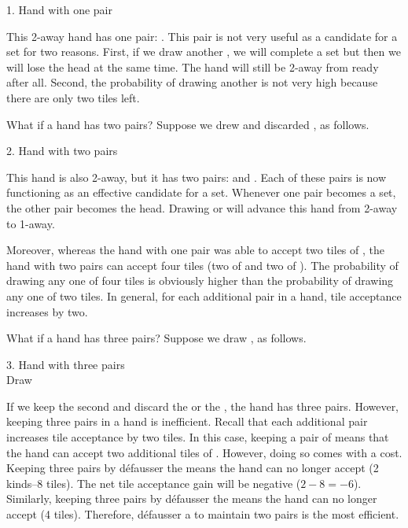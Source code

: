 {%
\begin{itembox}[r]{1. Hand with one pair}
\bp
{}\bei
\ep
\end{itembox}
\noindent
This 2-away hand has one pair: {\LARGE{}}. This pair is not very useful as a candidate for a set for two reasons. First, if we draw another {\LARGE{}}, we will complete a set but then we will lose the head at the same time. The hand will still be 2-away from ready after all. Second, the probability of drawing another {\LARGE{}} is not very high because there are only two tiles left. 

\bigskip
What if a hand has two pairs? Suppose we drew {\LARGE{}} and discarded {\LARGE\bei}, as follows.

\bigskip
\begin{itembox}[r]{2. Hand with two pairs}
\bp
{}
\ep
\end{itembox}
\noindent This hand is also 2-away, but it has two pairs: {\LARGE{}} and {\LARGE{}}. 
Each of these pairs is now functioning as an effective candidate for a set. Whenever one pair becomes a set, the other pair becomes the head. Drawing {\LARGE{}} or {\LARGE{}} will advance this hand from 2-away to 1-away. 

\bigskip
Moreover, whereas the hand with one pair was able to accept two tiles of {\LARGE{}}, the hand with two pairs can accept four tiles (two of {\LARGE{}} and two of {\LARGE{}}). The probability of drawing any one of four tiles is obviously higher than the probability of drawing any one of two tiles. 
In general, for each additional pair in a hand, tile acceptance increases by two. 

\bigskip
What if a hand has three pairs? Suppose we draw {\LARGE{}}, as follows. 

\bigskip
\begin{itembox}[r]{3. Hand with three pairs}
\bp
{}~\\
\hfill\footnotesize{Draw~~~~~~~~~~~}
\ep
\end{itembox}
\noindent If we keep the second {\LARGE{}} and discard the {\LARGE{}} or the {\LARGE{}}, the hand has three pairs. However, keeping three pairs in a hand is inefficient. Recall that each additional pair increases tile acceptance by two tiles. In this case, keeping a pair of {\LARGE{}} means that the hand can accept two additional tiles of {\LARGE{}}. However, doing so comes with a cost. Keeping three pairs by défausser the {\LARGE{}} means the hand can no longer accept {\LARGE{} } (2 kinds--8 tiles). The net tile acceptance gain will be negative ($2-8 = -6$). Similarly, keeping three pairs by défausser the {\LARGE{}} means the hand can no longer accept {\LARGE{}} (4 tiles). 
Therefore, défausser a {\LARGE{}} to maintain two pairs is the most efficient. 

}
